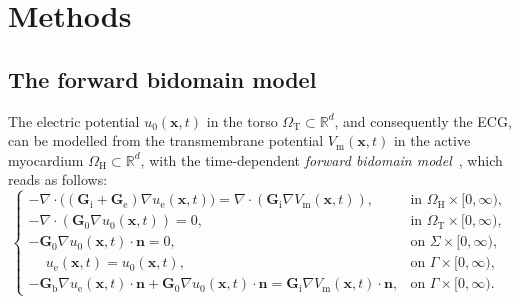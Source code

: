 \documentclass[runningheads]{llncs}
\newcommand{\ue}{u_\mathrm{e}}
\newcommand{\Vm}{V_\mathrm{m}}
\newcommand{\vz}{\mathbf{z}}
\newcommand{\vx}{\mathbf{x}}
\newcommand{\vn}{\mathbf{n}}
\newcommand{\tG}{\mathbf{G}}
\newcommand{\tGi}{\tG_\mathrm{i}}
\newcommand{\tGe}{\tG_\mathrm{e}}
\newcommand{\tGb}{\tG_\mathrm{b}}
\newcommand{\tGm}{\tG_\mathrm{m}}
\newcommand{\Cm}{C_\mathrm{m}}
\newcommand{\fion}{f_\mathrm{ion}}
\newcommand{\R}{\mathbb{R}}
\newcommand{\OmegaH}{\Omega_\mathrm{H}}
\newcommand{\OmegaT}{\Omega_\mathrm{T}}
\begin{document}
\section{Methods}
\label{sec:meth}

\subsection{The forward bidomain model}
The electric potential $u_0(\vx,t)$ in the torso $\OmegaT\subset\R^d$,
and consequently the ECG, can be modelled from the transmembrane potential
$\Vm(\vx,t)$ in the active myocardium $\OmegaH\subset\R^d$,
with the time-dependent \emph{forward bidomain model}~\cite{potse2006},
which reads as follows:
\begin{equation}\label{eq:bidomain}
\begin{cases}
-\nabla\cdot\bigl((\tGi+\tGe)\nabla\ue(\vx,t)\bigr)  = \nabla\cdot(\tGi\nabla\Vm(\vx,t)),
& \mbox{in $\OmegaH\times[0,\infty)$}, \\
-\nabla\cdot(\tG_0\nabla u_0(\vx,t)) = 0, & \mbox{in $\OmegaT\times[0,\infty)$}, \\
-\tG_0\nabla u_0(\vx,t)\cdot\vn = 0, & \mbox{on $\Sigma\times[0,\infty)$}, \\
\phantom{-}\ue(\vx,t) = u_0(\vx,t), & \mbox{on $\Gamma\times[0,\infty)$}, \\
-\tGb\nabla\ue(\vx,t)\cdot\vn + \tG_0\nabla u_0(\vx,t)\cdot\vn = \tGi\nabla\Vm(\vx,t)\cdot\vn, &
\mbox{on $\Gamma\times[0,\infty)$}.
\end{cases}
\end{equation}
\end{document}
